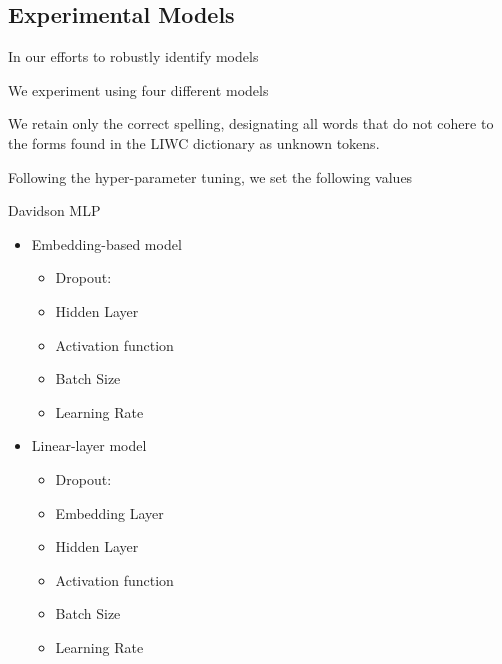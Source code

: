 \subsection{Experimental Models}

In our efforts to robustly identify models

We experiment using four different models

We retain only the correct spelling, designating all words that do not cohere to the forms found in the LIWC dictionary as unknown tokens.


Following the hyper-parameter tuning, we set the following values


Davidson MLP
\begin{itemize}
  \item Embedding-based model
    \begin{itemize}
      \item Dropout:
      \item Hidden Layer
      \item Activation function
      \item Batch Size
      \item Learning Rate
    \end{itemize}
  \item Linear-layer model
    \begin{itemize}
      \item Dropout:
      \item Embedding Layer
      \item Hidden Layer
      \item Activation function
      \item Batch Size
      \item Learning Rate
    \end{itemize}
\end{itemize}

